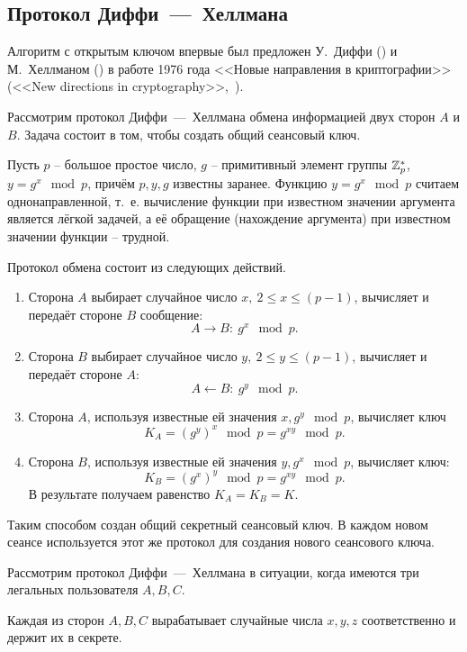 \subsection{Протокол Диффи~---~Хеллмана}

Алгоритм с открытым ключом впервые был предложен У.~Диффи () и М.~Хеллманом () в работе 1976 года <<Новые направления в криптографии>>(<<New directions in cryptography>>,~\cite{Diffie:Hellman:1976}).

Рассмотрим протокол Диффи~---~Хеллмана обмена информацией двух сторон $A$ и $B$. Задача состоит в том, чтобы создать общий сеансовый ключ.

Пусть $p$ -- большое простое число, $g$ -- примитивный элемент группы $\mathbb{Z}_p^*$, ~ $y = g^x \mod p$, причём $p,y,g$ известны заранее. Функцию $y=g^{x} \mod p$ считаем однонаправленной, т.~е. вычисление функции при известном значении аргумента является лёгкой задачей, а её обращение (нахождение аргумента) при известном значении функции -- трудной.

Протокол обмена состоит из следующих действий.
\begin{enumerate}
    \item Сторона $A$ выбирает случайное число $x, ~ 2 \leq x \leq (p-1)$, вычисляет и передаёт стороне $B$ сообщение:
        \[ A \rightarrow B: ~ g^x \mod p. \]
    \item Сторона $B$ выбирает случайное число $y, ~ 2\leq y \leq (p-1)$, вычисляет и передаёт стороне $A$:
        \[ A \leftarrow B: ~ g^y \mod p. \]
    \item Сторона $A$, используя известные ей значения $x,g^{y} \mod p$, вычисляет ключ
        \[ K_{A} =(g^{y})^{x}\mod p=g^{xy} \mod p. \]
    \item Сторона $B$, используя известные ей значения $y,g^{x} \mod p$, вычисляет ключ:
        \[ K_{B} =(g^{x})^{y}\mod p=g^{xy}\mod p. \]
        В результате получаем равенство $K_A = K_B = K$.
\end{enumerate}

Таким способом создан общий секретный сеансовый ключ. В каждом новом сеансе используется этот же протокол для создания нового сеансового ключа.

Рассмотрим протокол Диффи~---~Хеллмана в ситуации, когда имеются три легальных пользователя $A,B,C$.

Каждая из сторон $A,B,C$ вырабатывает случайные числа $x,y,z$ соответственно и держит их в секрете.

